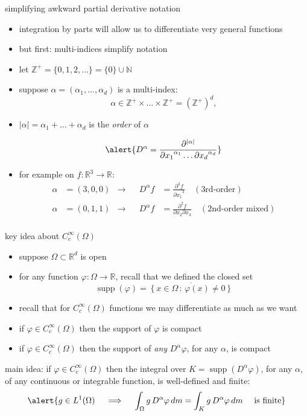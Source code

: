 \documentclass[10pt,
               svgnames,
               hyperref={colorlinks,
                         citecolor=DeepPink4,
                         linkcolor=FireBrick,
                         urlcolor=blue},
               usepdftitle=false]{beamer}
\newcommand{\NN}{\mathbb{N}}
\newcommand{\RR}{\mathbb{R}}
\newcommand{\ZZ}{\mathbb{Z}}
\begin{document}
\begin{frame}{simplifying awkward partial derivative notation}

\begin{itemize}
\item integration by parts will allow us to differentiate very general functions
\item but first: multi-indices simplify notation

\smallskip
\item let $\ZZ^+=\{0,1,2,\dots\} = \{0\}\cup\NN$
\item suppose \alert{$\alpha=(\alpha_1,\dots,\alpha_d)$} is a \alert{multi-index}:
	$$\alpha \in \ZZ^+\times \dots \times \ZZ^+ = \left(\ZZ^+\right)^d,$$
\item \alert{$|\alpha| = \alpha_1 + \dots + \alpha_d$} is the \emph{order} of $\alpha$

\begin{definition}
$$\alert{D^\alpha = \frac{\partial^{|\alpha|}}{{\partial x_1}^{\alpha_1} \dots {\partial x_d}^{\alpha_d}}}$$
\end{definition}

\item for example on $f:\RR^3\to\RR$:
\begin{align*}
\alpha&=(3,0,0) &\to && D^\alpha f &= \frac{\partial^3 f}{{\partial x_1}^3} \quad (\text{3rd-order}) \\
\alpha&=(0,1,1) &\to && D^\alpha f &= \frac{\partial^2 f}{\partial x_2 \partial x_3} \quad (\text{2nd-order mixed})\\
\end{align*}
\end{itemize}
\end{frame}


\begin{frame}{key idea about $C_c^\infty(\Omega)$}

\begin{itemize}
\item suppose $\Omega\subset \RR^d$ is open
\item for any function $\varphi:\Omega \to \RR$, recall that we defined the closed set
	$$\operatorname{supp}(\varphi) = \overline{\left\{x\in\Omega\,:\, \varphi(x) \ne 0\right\}}$$
\item recall that for $C_c^\infty(\Omega)$ functions we may differentiate as much as we want
\item if $\varphi\in C_c^\infty(\Omega)$ then the support of $\varphi$ is compact
\item if $\varphi\in C_c^\infty(\Omega)$ then the support of \emph{any} $D^\alpha \varphi$, for any $\alpha$, is compact
\end{itemize}

\begin{block}{main idea:}
\alert{if $\varphi\in C_c^\infty(\Omega)$ then the integral over $K=\operatorname{supp}(D^\alpha \varphi)$, for any $\alpha$, of any continuous or integrable function, is well-defined and finite:}
$$\alert{g \in L^1(\Omega) \quad \implies \quad \int_\Omega g\, D^\alpha \varphi\,dm = \int_K g\, D^\alpha \varphi\,dm \quad \text{ is finite}}$$
\end{block}
\end{frame}
\end{document}
